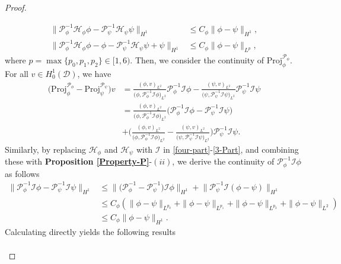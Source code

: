 \documentclass[preprint,3p]{elsarticle}
\begin{document}
\begin{proof}
\begin{itemize}[label={},left=0pt]
		\begin{align}
			\label{L-H}
			\big\|\mathcal{P}_{\phi}^{-1}\mathcal{H}_{\phi}\phi-\mathcal{P}_{\psi}^{-1}\mathcal{H}_{\psi}\psi\big\|_{H^1}&\le C_{\phi}\|\phi-\psi\|_{H^1},\\
			\big\|\mathcal{P}_{\phi}^{-1}\mathcal{H}_{\phi}\phi-\phi-\mathcal{P}_{\psi}^{-1}\mathcal{H}_{\psi}\psi+\psi\big\|_{H^1}&\le C_{\phi}\|\phi-\psi\|_{L^p},\label{L-H1}
		\end{align}
		where $p=\max\{p_0,p_1,p_2\}\in[1,6)$. Then, we consider the continuity of $\text{Proj}^{\mathcal{P}_{\phi}}_{\phi}$.
		For all $v\in H_0^1(\mathcal{D})$, we have
		\begin{align}\label{Proj-diff}
			\nonumber\Big(\text{Proj}^{\mathcal{P}_{\phi}}_{\phi}-\text{Proj}^{\mathcal{P}_{\psi}}_{\psi}\Big)v&=\frac{(\phi,v)_{L^2}}{\big(\phi,\mathcal{P}_{\phi}^{-1}\mathcal{I}\phi\big)_{L^2}}\mathcal{P}^{-1}_{\phi}\mathcal{I}\phi-\frac{(\psi,v)_{L^2}}{\big(\psi,\mathcal{P}_{\psi}^{-1}\mathcal{I}\psi\big)_{L^2}}\mathcal{P}^{-1}_{\psi}\mathcal{I}\psi\\
			\nonumber&=\frac{(\phi,v)_{L^2}}{\big(\phi,\mathcal{P}_{\phi}^{-1}\mathcal{I}\phi\big)_{L^2}}\big(\mathcal{P}^{-1}_{\phi}\mathcal{I}\phi-\mathcal{P}^{-1}_{\psi}\mathcal{I}\psi\big)\\&+\Bigg(\frac{(\phi,v)_{L^2}}{\big(\phi,\mathcal{P}_{\phi}^{-1}\mathcal{I}\phi\big)_{L^2}}-\frac{(\psi,v)_{L^2}}{\big(\psi,\mathcal{P}_{\psi}^{-1}\mathcal{I}\psi\big)_{L^2}}\Bigg)\mathcal{P}^{-1}_{\psi}\mathcal{I}\psi.
		\end{align}
		Similarly, by replacing $\mathcal{H}_{\phi}$ and $\mathcal{H}_{\psi}$ with $\mathcal{I}$ in \eqref{four-part}-\eqref{3-Part}, and combining these with {\bf Proposition \ref{Property-P}}-$(ii)$, we derive the continuity of $\mathcal{P}_{\phi}^{-1}\mathcal{I}\phi$ as follows
		\begin{align}\label{L-I}
			\nonumber\big\|\mathcal{P}_{\phi}^{-1}\mathcal{I}\phi-\mathcal{P}_{\psi}^{-1}\mathcal{I}\psi\big\|_{H^1}&\le \nonumber\big\|\big(\mathcal{P}_{\phi}^{-1}-\mathcal{P}_{\psi}^{-1}\big)\mathcal{I}\phi\big\|_{H^1}+\big\|\mathcal{P}_{\psi}^{-1}\mathcal{I}(\phi-\psi)\big\|_{H^1}\\ 
			&\le C_{\phi}\left(\|\phi-\psi\|_{L^{p_0}}+\|\phi-\psi\|_{L^{p_1}}+\|\phi-\psi\|_{L^{p_2}}+\|\phi-\psi\|_{L^2}\right)\\
			\nonumber&\le C_{\phi}\|\phi-\psi\|_{H^1}.
		\end{align}
		Calculating directly yields the following results
		\begin{align}\label{Orthogonalization-Coefficient-diff}

\end{align}
\end{itemize}
\end{proof}
\end{document}
